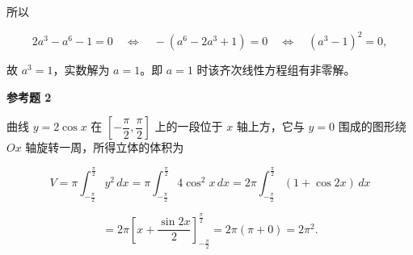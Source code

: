 \begin{answer}
所以

\nopagebreak[4]
\[
2a^3-a^6-1=0
\quad\Longleftrightarrow\quad
-(a^6-2a^3+1)=0
\quad\Longleftrightarrow\quad
(a^3-1)^2=0,
\]

故 $a^3=1$，实数解为 $a=1$。即 $a=1$ 时该齐次线性方程组有非零解。

\textbf{参考题 2}

曲线 $y=2\cos x$ 在 $\left[-\dfrac{\pi}{2},\dfrac{\pi}{2}\right]$ 上的一段位于 $x$ 轴上方，它与 $y=0$ 围成的图形绕 $Ox$ 轴旋转一周，所得立体的体积为

\nopagebreak[4]
\[
V=\pi\int_{-\frac{\pi}{2}}^{\frac{\pi}{2}}y^2\,dx
=\pi\int_{-\frac{\pi}{2}}^{\frac{\pi}{2}}4\cos^2x\,dx
=2\pi\int_{-\frac{\pi}{2}}^{\frac{\pi}{2}}(1+\cos2x)\,dx
\]

\nopagebreak[4]
\[
=2\pi\left[x+\frac{\sin2x}{2}\right]_{-\frac{\pi}{2}}^{\frac{\pi}{2}}
=2\pi(\pi+0)=2\pi^2.
\]


\end{answer}